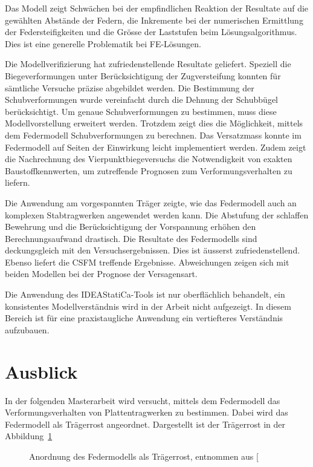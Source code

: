 \documentclass[
  11pt,
  letterpaper,
]{scrreprt}
\begin{document}
Das Modell zeigt Schwächen bei der empfindlichen Reaktion der Resultate
auf die gewählten Abstände der Federn, die Inkremente bei der
numerischen Ermittlung der Federsteifigkeiten und die Grösse der
Laststufen beim Lösungsalgorithmus. Dies ist eine generelle Problematik
bei FE-Lösungen.

Die Modellverifizierung hat zufriedenstellende Resultate geliefert.
Speziell die Biegeverformungen unter Berücksichtigung der Zugversteifung
konnten für sämtliche Versuche präzise abgebildet werden. Die Bestimmung
der Schubverformungen wurde vereinfacht durch die Dehnung der Schubbügel
berücksichtigt. Um genaue Schubverformungen zu bestimmen, muss diese
Modellvorstellung erweitert werden. Trotzdem zeigt dies die Möglichkeit,
mittels dem Federmodell Schubverformungen zu berechnen. Das Versatzmass
konnte im Federmodell auf Seiten der Einwirkung leicht implementiert
werden. Zudem zeigt die Nachrechnung des Vierpunktbiegeversuchs die
Notwendigkeit von exakten Baustoffkennwerten, um zutreffende Prognosen
zum Verformungsverhalten zu liefern.

Die Anwendung am vorgespannten Träger zeigte, wie das Federmodell auch
an komplexen Stabtragwerken angewendet werden kann. Die Abstufung der
schlaffen Bewehrung und die Berücksichtigung der Vorspannung erhöhen den
Berechnungsaufwand drastisch. Die Resultate des Federmodells sind
deckungsgleich mit den Versuchsergebnissen. Dies ist äusserst
zufriedenstellend. Ebenso liefert die CSFM treffende Ergebnisse.
Abweichungen zeigen sich mit beiden Modellen bei der Prognose der
Versagensart.

Die Anwendung des IDEAStatiCa-Tools ist nur oberflächlich behandelt, ein
konsistentes Modellverständnis wird in der Arbeit nicht aufgezeigt. In
diesem Bereich ist für eine praxistaugliche Anwendung ein vertiefteres
Verständnis aufzubauen.

\section{Ausblick}\label{ausblick}

In der folgenden Masterarbeit wird versucht, mittels dem Federmodell das
Verformungsverhalten von Plattentragwerken zu bestimmen. Dabei wird das
Federmodell als Trägerrost angeordnet. Dargestellt ist der Trägerrost in
der Abbildung~\ref{fig-traegerrost}

\begin{figure}[H]


\caption{\label{fig-traegerrost}Anordnung des Federmodells als
Trägerrost, entnommen aus {[}\citeproc{ref-gitz_ansatze_2024}{1}{]}}

\end{figure}%
\end{document}

